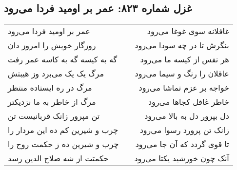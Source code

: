 \begin{center}
\section*{غزل شماره ۸۲۳: عمر بر اومید فردا می‌رود}
\label{sec:0823}
\begin{longtable}{l p{0.5cm} r}
عمر بر اومید فردا می‌رود
&&
غافلانه سوی غوغا می‌رود
\\
روزگار خویش را امروز دان
&&
بنگرش تا در چه سودا می‌رود
\\
گه به کیسه گه به کاسه عمر رفت
&&
هر نفس از کیسه ما می‌رود
\\
مرگ یک یک می‌برد وز هیبتش
&&
عاقلان را رنگ و سیما می‌رود
\\
مرگ در ره ایستاده منتظر
&&
خواجه بر عزم تماشا می‌رود
\\
مرگ از خاطر به ما نزدیکتر
&&
خاطر غافل کجاها می‌رود
\\
تن مپرور زانک قربانیست تن
&&
دل بپرور دل به بالا می‌رود
\\
چرب و شیرین کم ده این مردار را
&&
زانک تن پرورد رسوا می‌رود
\\
چرب و شیرین ده ز حکمت روح را
&&
تا قوی گردد که آن جا می‌رود
\\
حکمتت از شه صلاح الدین رسد
&&
آنک چون خورشید یکتا می‌رود
\\
\end{longtable}
\end{center}
